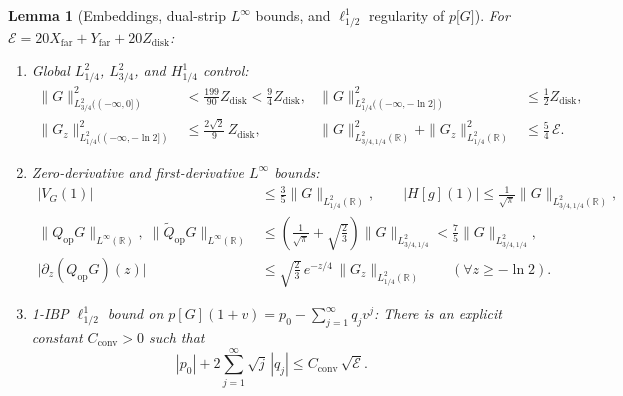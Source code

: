 \documentclass[11pt,a4paper]{article}
\newtheorem{lem}{Lemma}[section]
\begin{document}
\begin{lem}[Embeddings, dual-strip $L^\infty$ bounds, and $\ell^1_{1/2}$ regularity of $p\lbrack G\rbrack$]\label{lem:embeddings}
For $\mathcal{E}=20 X_{\mathrm{far}} + Y_{\mathrm{far}} + 20 Z_{\mathrm{disk}}$:
\begin{enumerate}\setlength\itemsep{1pt}
\item \emph{Global $L^2_{1/4}$, $L^2_{3/4}$, and $H^1_{1/4}$ control:}
  \begin{align}
  \|G\|_{L^2_{3/4}((-\infty,0])}^2 &< \frac{199}{90}Z_{\mathrm{disk}} < \frac{9}{4}Z_{\mathrm{disk}}, &
  \|G\|_{L^2_{1/4}((-\infty,-\ln 2])}^2 &\le \frac{1}{2}Z_{\mathrm{disk}}, \label{eq:edge_emb}\\
  \|G_z\|_{L^2_{1/4}((-\infty,-\ln 2])}^2 &\le \frac{2\sqrt{2}}{9}\,Z_{\mathrm{disk}}, &
  \|G\|_{L^2_{3/4,1/4}(\mathbb{R})}^2 + \|G_z\|_{L^2_{1/4}(\mathbb{R})}^2 &\le \frac{5}{4}\,\mathcal{E}. \label{eq:global_Gz}
  \end{align}
\item \emph{Zero-derivative and first-derivative $L^\infty$ bounds:}
  \begin{align}
  |V_G(1)| &\le \frac{3}{5}\|G\|_{L^2_{1/4}(\mathbb{R})}, \qquad
  |H[g](1)| \le \frac{1}{\sqrt{\pi}}\|G\|_{L^2_{3/4,1/4}(\mathbb{R})}, \nonumber\\
  \|Q_{\mathrm{op}}G\|_{L^\infty(\mathbb{R})},\;\|\widetilde{Q}_{\mathrm{op}}G\|_{L^\infty(\mathbb{R})}
    &\le \left(\frac{1}{\sqrt{\pi}}+\sqrt{\frac{2}{3}}\right)\|G\|_{L^2_{3/4,1/4}} < \frac{7}{5}\|G\|_{L^2_{3/4,1/4}}, \label{eq:Q_linf}\\
  \bigl|\partial_z(Q_{\mathrm{op}}G)(z)\bigr|
    &\le \sqrt{\frac{2}{3}}\,e^{-z/4}\,\|G_z\|_{L^2_{1/4}(\mathbb{R})} \qquad (\forall z\ge -\ln 2). \label{eq:dQ_linf}
  \end{align}
\item \emph{1-IBP $\ell^1_{1/2}$ bound on $p[G](1+v) = p_0 - \sum_{j=1}^\infty q_j v^j$:}
  There is an explicit constant $C_{\mathrm{conv}}>0$ such that
  \begin{equation}\label{eq:p_l1half}
  |p_0| + 2\sum_{j=1}^\infty \sqrt{j}\,|q_j| \le C_{\mathrm{conv}}\,\sqrt{\mathcal{E}}.
  \end{equation}
\end{enumerate}
\end{lem}
\end{document}

